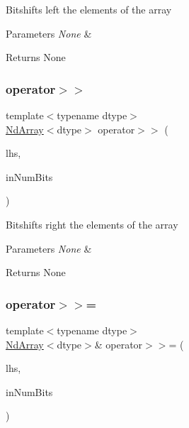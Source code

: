 Bitshifts left the elements of the array


\begin{DoxyParams}{Parameters}
{\em None} & \\
\hline
\end{DoxyParams}
\begin{DoxyReturn}{Returns}
None 
\end{DoxyReturn}
\mbox{\label{class_num_c_1_1_nd_array_ab15a0eab1b334b204ab5dd780c35435a}} 
\subsubsection{\texorpdfstring{operator$>$$>$}{operator>>}}
{\footnotesize\ttfamily template$<$typename dtype$>$ \\
\mbox{\hyperlink{class_num_c_1_1_nd_array}{Nd\+Array}}$<$dtype$>$ operator$>$$>$ (\begin{DoxyParamCaption}\item[{const \mbox{\hyperlink{class_num_c_1_1_nd_array}{Nd\+Array}}$<$ dtype $>$ \&}]{lhs,  }\item[{\mbox{\hyperlink{namespace_num_c_a60b2e2f49e1ff61059731c154e560869}{uint8}}}]{in\+Num\+Bits }\end{DoxyParamCaption})\hspace{0.3cm}{\ttfamily [friend]}}

Bitshifts right the elements of the array


\begin{DoxyParams}{Parameters}
{\em None} & \\
\hline
\end{DoxyParams}
\begin{DoxyReturn}{Returns}
None 
\end{DoxyReturn}
\mbox{\label{class_num_c_1_1_nd_array_a176583bd05fbbbf2f7ef9984cac49f76}} 
\subsubsection{\texorpdfstring{operator$>$$>$=}{operator>>=}}
{\footnotesize\ttfamily template$<$typename dtype$>$ \\
\mbox{\hyperlink{class_num_c_1_1_nd_array}{Nd\+Array}}$<$dtype$>$\& operator$>$$>$= (\begin{DoxyParamCaption}\item[{\mbox{\hyperlink{class_num_c_1_1_nd_array}{Nd\+Array}}$<$ dtype $>$ \&}]{lhs,  }\item[{\mbox{\hyperlink{namespace_num_c_a60b2e2f49e1ff61059731c154e560869}{uint8}}}]{in\+Num\+Bits }\end{DoxyParamCaption})\hspace{0.3cm}{\ttfamily [friend]}}

